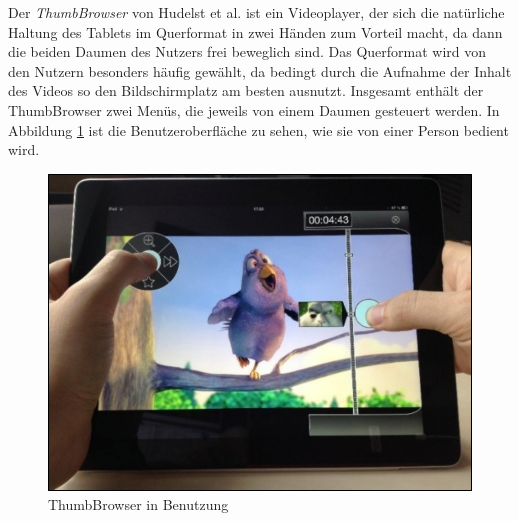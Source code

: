 \documentclass[11pt,a4paper]{report}
\begin{document}
Der \emph{ThumbBrowser} von Hudelst et al. \cite{hudelist2013mobile} ist ein Videoplayer, der sich die natürliche Haltung des Tablets im Querformat in zwei Händen zum Vorteil macht, da dann die beiden Daumen des Nutzers frei beweglich sind. Das Querformat wird von den Nutzern besonders häufig gewählt, da bedingt durch die Aufnahme der Inhalt des Videos so den Bildschirmplatz am besten ausnutzt. Insgesamt enthält der ThumbBrowser zwei Menüs, die jeweils von einem Daumen gesteuert werden. In Abbildung \ref{thumbbrowser} ist die Benutzeroberfläche zu sehen, wie sie von einer Person bedient wird.
\begin{figure}[h]
\begin{center}
\includegraphics[scale=1]{./images/10.png}
\caption{ThumbBrowser in Benutzung \cite{hudelist2013mobile}}
\label{thumbbrowser}
\end{center}
\end{figure}
\end{document}
